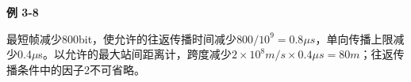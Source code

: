{\color{ink}\bfseries 例 3-8}\par\vspace{1bp}最短帧减少800bit，使允许的往返传播时间减少\(800/\allowbreak{}10^{9}=\allowbreak{}0.8\mu s\)，单向传播上限减少0.4\(\mu \)s。以允许的最大站间距离计，跨度减少\(2\times 10^{8}m/\allowbreak{}s\times 0.4\mu s=\allowbreak{}80m\)；往返传播条件中的因子2不可省略。
